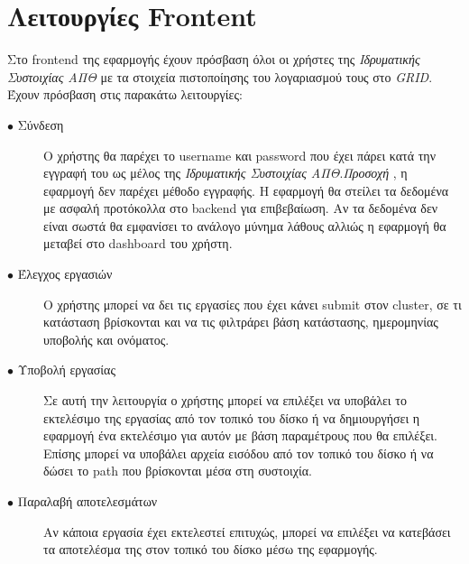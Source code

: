 \vspace{60mm}

\section{Λειτουργίες Frontent}

Στο frontend της εφαρμογής έχουν πρόσβαση όλοι οι χρήστες της  \textit{Ιδρυματικής Συστοιχίας ΑΠΘ} με τα στοιχεία πιστοποίησης του λογαριασμού τους στο \textit{GRID}. Έχουν πρόσβαση στις παρακάτω λειτουργίες:

\begin{description}
  \item[$\bullet$ Σύνδεση] O χρήστης θα παρέχει το username και password που έχει πάρει κατά την εγγραφή του ως μέλος της \textit{Ιδρυματικής Συστοιχίας ΑΠΘ}.\textit{Προσοχή} , η εφαρμογή δεν παρέχει μέθοδο εγγραφής. Η εφαρμογή θα στείλει τα δεδομένα με ασφαλή προτόκολλα στο backend για επιβεβαίωση. Αν τα δεδομένα δεν είναι σωστά θα εμφανίσει το ανάλογο μύνημα λάθους αλλιώς η εφαρμογή θα μεταβεί στο dashboard του χρήστη.
  \item[$\bullet$ Έλεγχος εργασιών] Ο χρήστης μπορεί να δει τις εργασίες που έχει κάνει submit στον cluster, σε τι κατάσταση βρίσκονται και να τις φιλτράρει βάση κατάστασης, ημερομηνίας υποβολής και ονόματος.
    \item[$\bullet$ Υποβολή εργασίας] Σε αυτή την λειτουργία ο χρήστης μπορεί να επιλέξει να υποβάλει το εκτελέσιμο της εργασίας από τον τοπικό του δίσκο ή να δημιουργήσει η εφαρμογή ένα εκτελέσιμο για αυτόν με βάση παραμέτρους που θα επιλέξει. Επίσης μπορεί να υποβάλει αρχεία εισόδου από τον τοπικό του δίσκο ή να δώσει το path που βρίσκονται μέσα στη συστοιχία.
    \item[$\bullet$ Παραλαβή αποτελεσμάτων] Αν κάποια εργασία έχει εκτελεστεί επιτυχώς, μπορεί να επιλέξει να κατεβάσει τα αποτελέσμα της στον τοπικό του δίσκο μέσω της εφαρμογής.
\end{description}







